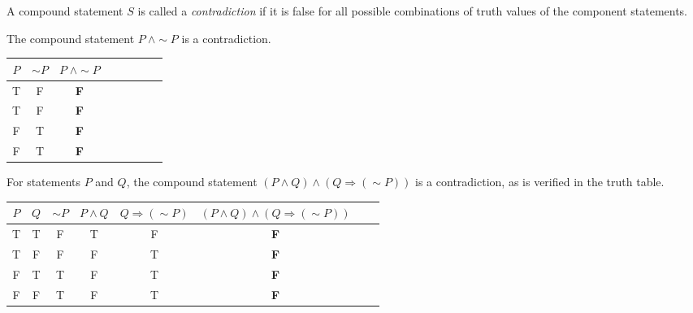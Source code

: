 \begin{defi}[Contradiction]
    A compound statement $S$ is called a \emph{contradiction} if it is false 
    for all possible combinations of truth values of the component statements.
\end{defi}
\begin{eg}
    The compound statement $P \: \wedge \sim P$ is a contradiction.
    \begin{center}
        \begin{tabular}{cccccccc}
          \toprule
          $P$ & $\sim P$ &$P\;\wedge \sim P$ \\
          \midrule
          T & F & \textbf{F} \\
          T & F & \textbf{F} \\
          F & T & \textbf{F} \\
          F & T & \textbf{F} \\
          \bottomrule
        \end{tabular}
      \end{center}
\end{eg}
\begin{eg}
    For statements $P$ and $Q$, the compound statement $(P \wedge Q) \wedge (Q \Rightarrow (\sim P))$ 
    is a contradiction, as is verified in the truth table.
    \begin{center}
        \begin{tabular}{cccccccc}
          \toprule
          $P$ & $Q$ &$\sim P$ & $P \wedge Q$ & $Q \Rightarrow (\sim P)$ & 
          $(P \wedge Q) \wedge (Q \Rightarrow (\sim P))$ \\
          \midrule
          T & T & F & T & F & \textbf{F} \\
          T & F & F & F & T & \textbf{F} \\
          F & T & T & F & T & \textbf{F} \\
          F & F & T & F & T & \textbf{F} \\
          \bottomrule
        \end{tabular}
      \end{center}
\end{eg}

